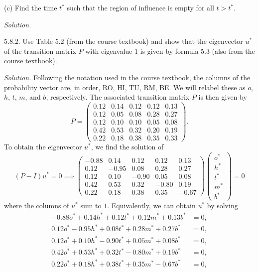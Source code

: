 \documentclass{article}
\begin{document}
(c) Find the time $t^*$ such that the region of influence is empty for all
$t > t^*$.

\textit{Solution.}

\newpage

5.8.2. Use Table 5.2 (from the course textbook) and show that the eigenvector
$u^*$ of the transition matrix $P$ with eigenvalue $1$ is given by formula 5.3
(also from the course textbook).

\textit{Solution.}
Following the notation used in the course textbook, the columns of the
probability vector are, in order, RO, HI, TU, RM, BE. We will relabel
these as $o$, $h$, $t$, $m$, and $b$, respectively. The associated
transition matrix $P$ is then given by
%
\begin{equation*}
    P =
    \begin{pmatrix}
        0.12 & 0.14 & 0.12 & 0.12 & 0.13 \\
        0.12 & 0.05 & 0.08 & 0.28 & 0.27 \\
        0.12 & 0.10 & 0.10 & 0.05 & 0.08 \\
        0.42 & 0.53 & 0.32 & 0.20 & 0.19 \\
        0.22 & 0.18 & 0.38 & 0.35 & 0.33
    \end{pmatrix}
    .
\end{equation*}
%
To obtain the eigenvector $u^*$, we find the solution of
%
\begin{equation*}
    (P - I) u^* = 0
    \implies
    \begin{pmatrix}
        - 0.88 & 0.14 & 0.12 & 0.12 & 0.13 \\
        0.12 & - 0.95 & 0.08 & 0.28 & 0.27 \\
        0.12 & 0.10 & - 0.90 & 0.05 & 0.08 \\
        0.42 & 0.53 & 0.32 & - 0.80 & 0.19 \\
        0.22 & 0.18 & 0.38 & 0.35 & - 0.67
    \end{pmatrix}
    \begin{pmatrix}
        o^* \\
        h^* \\
        t^* \\
        m^* \\
        b^*
    \end{pmatrix}
    = 0
\end{equation*}
%
where the columns of $u^*$ sum to $1$.
Equivalently, we can obtain $u^*$ by solving
%
\begin{align*}
    - 0.88 o^* + 0.14 h^* + 0.12 t^* + 0.12 m^* + 0.13 b^* &= 0, \\
    0.12 o^* - 0.95  h^* + 0.08 t^* + 0.28 m^* + 0.27 b^* &= 0, \\
    0.12 o^* + 0.10  h^* - 0.90 t^* + 0.05 m^* + 0.08 b^* &= 0, \\
    0.42 o^* + 0.53  h^* + 0.32 t^* - 0.80 m^* + 0.19 b^* &= 0, \\
    0.22 o^* + 0.18  h^* + 0.38 t^* + 0.35 m^* - 0.67 b^* &= 0,
\end{align*}
\end{document}

